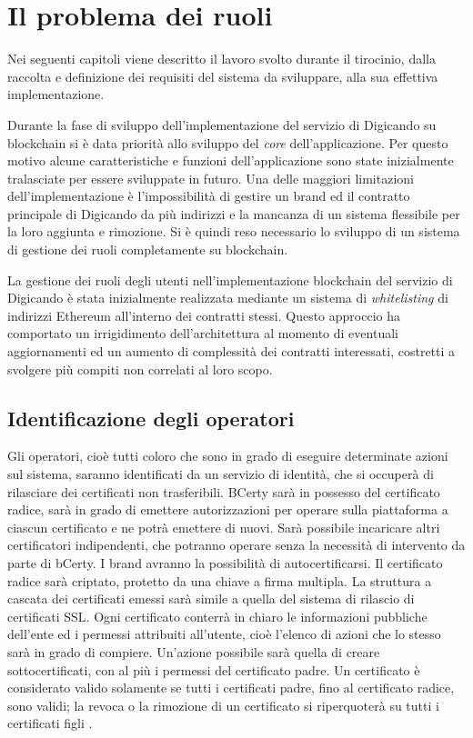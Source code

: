 \chapter{Il problema dei ruoli}
\label{cha:problema-ruoli}
Nei seguenti capitoli viene descritto il lavoro svolto durante il tirocinio, dalla raccolta e definizione dei requisiti del sistema da sviluppare, alla sua effettiva implementazione.

Durante la fase di sviluppo dell'implementazione del servizio di Digicando su blockchain si è data priorità allo sviluppo del \emph{core} dell'applicazione. Per questo motivo alcune caratteristiche e funzioni dell'applicazione sono state inizialmente tralasciate per essere sviluppate in futuro. Una delle maggiori limitazioni dell'implementazione è l'impossibilità di gestire un brand ed il contratto principale di Digicando da più indirizzi e la mancanza di un sistema flessibile per la loro aggiunta e rimozione. Si è quindi reso necessario lo sviluppo di un sistema di gestione dei ruoli completamente su blockchain.

La gestione dei ruoli degli utenti nell'implementazione blockchain del servizio di Digicando è stata inizialmente realizzata mediante un sistema di \emph{whitelisting} di indirizzi Ethereum all'interno dei contratti stessi. Questo approccio ha comportato un irrigidimento dell'architettura al momento di eventuali aggiornamenti ed un aumento di complessità dei contratti interessati, costretti a svolgere più compiti non correlati al loro scopo.

\section{Identificazione degli operatori}
Gli operatori, cioè tutti coloro che sono in grado di eseguire determinate azioni sul sistema, saranno identificati da un servizio di identità, che si occuperà di rilasciare dei certificati non trasferibili. BCerty sarà in possesso del certificato radice, sarà in grado di emettere autorizzazioni per operare sulla piattaforma  a ciascun certificato e ne potrà emettere di nuovi. Sarà possibile incaricare altri certificatori indipendenti, che potranno operare senza la necessità di intervento da parte di bCerty. I brand avranno la possibilità di autocertificarsi. Il certificato radice sarà criptato, protetto da una chiave a firma multipla. La struttura a cascata dei certificati emessi sarà simile a quella del sistema di rilascio di certificati SSL. Ogni certificato conterrà in chiaro le informazioni pubbliche dell'ente ed i permessi attribuiti all'utente, cioè l'elenco di azioni che lo stesso sarà in grado di compiere. Un'azione possibile sarà quella di creare sottocertificati, con al più i permessi del certificato padre. Un certificato è considerato valido solamente se tutti i certificati padre, fino al certificato radice, sono validi; la revoca o la rimozione di un certificato si riperquoterà su tutti i certificati figli \cite{bCerty-whitepaper}.

